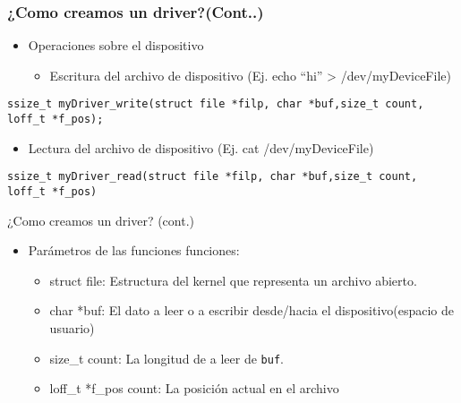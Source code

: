 \begin{frame}[fragile]
\frametitle{¿Como creamos un driver?(Cont..)}
  \begin{itemize}
  \item Operaciones sobre el dispositivo  
  \begin{itemize}
    \item Escritura del archivo de dispositivo (Ej.  echo ``hi'' > /dev/myDeviceFile) 
  \end{itemize}	
  \end{itemize}
\begin{lstlisting}
ssize_t myDriver_write(struct file *filp, char *buf,size_t count, loff_t *f_pos);
\end{lstlisting}

\begin{itemize}
  \item Lectura del archivo de dispositivo  (Ej. cat /dev/myDeviceFile)  
 \end{itemize}

\begin{lstlisting}
ssize_t myDriver_read(struct file *filp, char *buf,size_t count, loff_t *f_pos)
\end{lstlisting}
\end{frame}

\begin{frame}{¿Como creamos un driver? (cont.)}

  \begin{itemize}
  \item Parámetros de las funciones funciones:
 	 \begin{itemize}
 	   \item struct file: Estructura del kernel que representa un archivo abierto.
	   \item char *buf: El dato a leer o a escribir desde/hacia el dispositivo(espacio de usuario) 
	   \item size\_t count: La longitud de a leer de \texttt{buf}.
           \item loff\_t *f\_pos count: La posición actual en el archivo
 	 \end{itemize}  
  \end{itemize}
\end{frame}

